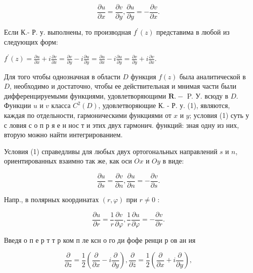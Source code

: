 \documentclass[10pt]{article}
\begin{document}
\[

\frac{\partial u}{\partial x}=\frac{\partial v}{\partial y}, \frac{\partial u}{\partial y}=-\frac{\partial v}{\partial x} .

\]



Если К.- Р. у. выполнены, то производная $f^{\prime}(z)$ представима в любой из следующих форм:



$f^{\prime}(z)=\frac{\partial u}{\partial x}+i \frac{\partial v}{\partial x}=\frac{\partial v}{\partial y}-i \frac{\partial u}{\partial y}=\frac{\partial u}{\partial x}-i \frac{\partial u}{\partial y}=\frac{\partial v}{\partial y}+i \frac{\partial v}{\partial x}$.



Для того чтобы однозначная в области $D$ функция $f(z)$ была аналитической в $D$, необходимо и достаточно, чтобы ее действительная и мнимая части были дифференцируемыми функциями, удовлетворяющими $\mathbf{R} .-$ P. У. всюду в $D$. Функции $u$ и $v$ класса $C^{2}(D)$, удовлетворяющие К. - Р. у. (1), являются, каждая по отдельности, гармоническими функциями от $x$ и $y$; условия (1) суть у с ловия с о п р я е н нос т и этих двух гармонич. функций: зная одну из них, вторую можно найти интегрированием.



Условия (1) справедливы для любых двух ортогональных направлений $s$ и $n$, ориентированных взаимно так же, как оси $O x$ и $O y$ в виде:



\[

\frac{\partial u}{\partial s}=\frac{\partial v}{\partial n}, \frac{\partial u}{\partial n}=-\frac{\partial v}{\partial s} .

\]



Напр., в полярных координатах $(r, \varphi)$ при $r \neq 0$ :



\[

\frac{\partial u}{\partial r}=\frac{1}{r} \frac{\partial v}{\partial \varphi}, \frac{1}{r} \frac{\partial u}{\partial \varphi}=-\frac{\partial v}{\partial r} .

\]



Введя о п е р т т р ком п ле ксн о го ди фофе ренци р ов ан ия



\[

\frac{\partial}{\partial z}=\frac{1}{2}\left(\frac{\partial}{\partial x}-i \frac{\partial}{\partial y}\right), \frac{\partial}{\partial \bar{z}}=\frac{1}{2}\left(\frac{\partial}{\partial x}+i \frac{\partial}{\partial y}\right),

\]
\end{document}
